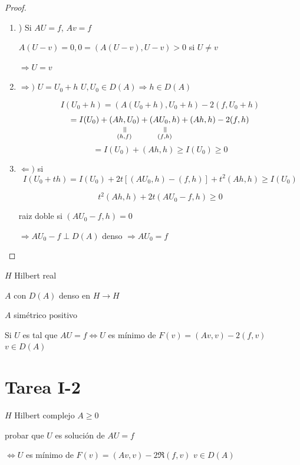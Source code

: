 \documentclass[a4paper,10pt]{book}
\newcommand{\roteq}{\mathbin{\rotatebox[origin=c]{270}{$=$}}}
\begin{document}
\begin{proof}
    \begin{enumerate}[label=\alph*]
        \item) Si $AU=f$, $Av=f$

        
        $A(U-v) =0 , 0= (A(U-v),U-v)>0$ si $U\neq v$
        
        $\Rightarrow U=v$

        \item $\Rightarrow )$ $U= U_0 +h$ $U, U_0\in D(A)\Rightarrow h\in D(A)$ 

        \[
        I(U_0 +h) = ( A(U_0+h) ,U_0+h) -2 (f,U_0 +h) \]
        \[
        =I(U_0) +\underset{\overset{\roteq}{(h,f)}}{( Ah,U_0) } + \underset{\overset{\roteq}{(f,h)}}{(AU_0,h)} +(Ah,h)-2(f,h)
        \]
        \[
        =I(U_0)+(Ah,h) \geq I(U_0) \geq 0
        \]

        \item $\Leftarrow )$ si 
        \[
        I(U_0+t h) = I(U_0) + 2t \left[ (AU_0,h) - (f,h) \right] + t^2 (Ah,h) \geq I(U_0) 
        \]


        \[t^2 (Ah,h) + 2t(AU_0-f,h) \geq 0
        \]

        raiz doble si $(AU_0 -f ,h)= 0$ 

        $\Rightarrow A U_0 -f \perp D(A) $ denso $\Rightarrow AU_0= f$
        
    \end{enumerate}
\end{proof}

$H$ Hilbert real

$A$ con $D(A)$ denso en $H\rightarrow H $

$A$ simétrico positivo

Si $U$ es tal que $AU=f \Leftrightarrow  U$ es mínimo de $ F(v)= (Av,v) -2(f,v) $ $v\in D(A)$

\section{Tarea I-2} $H$ Hilbert complejo $A\geq 0$

probar que $U$ es solución de $AU=f$ 

$\Leftrightarrow U $ es mínimo de $F(v) = (Av,v) -2 \Re (f,v)$ $v\in D(A)$
\end{document}
